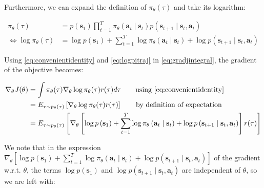 \documentclass{article}
\begin{document}
Furthermore, we can expand the definition of $\pi_\theta\left(\tau\right)$ and take its logarithm:

\begin{subequations}
  \begin{align}
    \pi_\theta\left(\tau\right)
      &= p\left(\mathbf{s}_1\right)\prod_{t=1}^T\pi_\theta\left(\mathbf{a}_t\mid \mathbf{s}_t\right)p\left(\mathbf{s}_{t+1} \mid \mathbf{s}_t ,\mathbf{a}_t\right)\\
    \Leftrightarrow \log\pi_\theta\left(\tau\right)
      &= \log p\left(\mathbf{s}_1\right) + \sum_{t=1}^T\log\pi_\theta\left(\mathbf{a}_t\mid \mathbf{s}_t\right)+ \log p\left(\mathbf{s}_{t+1} \mid \mathbf{s}_t ,\mathbf{a}_t\right) \label{eq:logpitraj}
  \end{align}
\end{subequations}



Using \eqref{eq:convenientidentity} and \eqref{eq:logpitraj} in \eqref{eq:gradjintegral}, the gradient of the objective becomes:

\begin{subequations}
  \begin{align}
    \nabla_\theta J(\theta) 
      &= \int\pi_\theta(\tau)\nabla_\theta\log\pi_\theta(\tau) r(\tau)d\tau \qquad\text{using \eqref{eq:convenientidentity}}\\
      &= E_{\tau\sim p_\theta(\tau)}\left[\nabla_\theta\log\pi_\theta(\tau) r(\tau)\right]\qquad\text{by definition of expectation}\\
      &= E_{\tau\sim p_\theta(\tau)}\left[\nabla_\theta \left[\log p\left(\mathbf{s}_1\right) + \sum_{t=1}^T\log\pi_\theta\left(\mathbf{a}_t\mid \mathbf{s}_t\right)+ \log p\left(\mathbf{s}_{t+1} \mid \mathbf{s}_t ,\mathbf{a}_t\right)\right] r(\tau)\right]
  \end{align}
\end{subequations}

We note that in the expression $\nabla_\theta \left[\log p\left(\mathbf{s}_1\right) + \sum_{t=1}^T\log\pi_\theta\left(\mathbf{a}_t\mid \mathbf{s}_t\right)+ \log p\left(\mathbf{s}_{t+1} \mid \mathbf{s}_t ,\mathbf{a}_t\right)\right]$ of the gradient w.r.t. $\theta$, the terms $\log p\left(\mathbf{s}_1\right)$ and $\log p\left(\mathbf{s}_{t+1} \mid \mathbf{s}_t ,\mathbf{a}_t\right)$ are independent of $\theta$, so we are left with:
\end{document}
